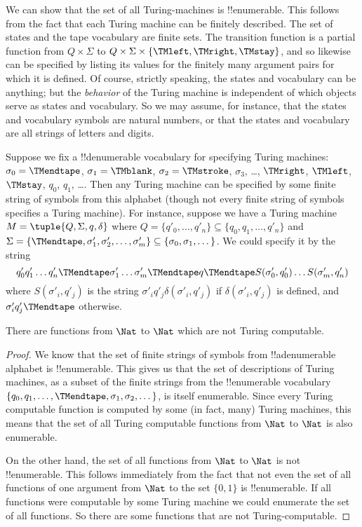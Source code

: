 \documentclass[../../../include/open-logic-section]{subfiles}
\begin{document}

\begin{explain}
We can show that the set of all Turing-machines is
!!{enumerable}. This follows from the fact that each Turing machine
can be finitely described.  The set of states and the tape vocabulary
are finite sets.  The transition function is a partial function from
$Q \times \Sigma$ to $Q \times \Sigma \times \{\TMleft, \TMright,
\TMstay\}$, and so likewise can be specified by listing its values for
the finitely many argument pairs for which it is defined.  Of course,
strictly speaking, the states and vocabulary can be anything; but the
\emph{behavior} of the Turing machine is independent of which objects
serve as states and vocabulary. So we may assume, for instance, that
the states and vocabulary symbols are natural numbers, or that the
states and vocabulary are all strings of letters and digits.

Suppose we fix a !!{denumerable} vocabulary for specifying Turing
machines: $\sigma_0 = \TMendtape$, $\sigma_1 = \TMblank$, $\sigma_2 =
\TMstroke$, $\sigma_3$, \dots, $\TMright$, $\TMleft$, $\TMstay$,
$q_0$, $q_1$, \dots. Then any Turing machine can be specified by some
finite string of symbols from this alphabet (though not every finite
string of symbols specifies a Turing machine). For instance, suppose
we have a Turing machine $M = \tuple{Q, \Sigma, q, \delta}$ where $Q =
\{q'_0, \dots, q'_n\} \subseteq \{q_0, q_1, \dots, q'_n\}$ and $\Sigma
= \{\TMendtape, \sigma'_1, \sigma'_2, \dots, \sigma'_m\}
\subseteq \{\sigma_0, \sigma_1, \dots\}$. We could specify it by
the string
\[
q'_0 q'_1 \dots q'_n \TMendtape \sigma'_1 \dots \sigma'_m \TMendtape q
\TMendtape S(\sigma'_0,q'_0) \dots S(\sigma'_m, q'_n)
\]
where $S(\sigma'_i, q'_j) $ is the string $\sigma'_i q'_j
\delta(\sigma'_i, q'_j)$ if $\delta(\sigma'_i,q'_j)$ is defined, and
$\sigma'_i q'_j \TMendtape$ otherwise.
\end{explain}

\begin{thm}
  There are functions from $\Nat$ to $\Nat$ which are not Turing
  computable.
\end{thm}

\begin{proof}
We know that the set of finite strings of symbols from
!!a{denumerable} alphabet is !!{enumerable}. This gives us that the
set of descriptions of Turing machines, as a subset of the finite
strings from the !!{enumerable} vocabulary $\{q_0, q_1, \dots,
\TMendtape, \sigma_1, \sigma_2, \dots\}$, is itself enumerable.  Since
every Turing computable function is computed by some (in fact, many)
Turing machines, this means that the set of all Turing computable
functions from $\Nat$ to $\Nat$ is also enumerable.

On the other hand, the set of all functions from $\Nat$ to $\Nat$ is
not !!{enumerable}. This follows immediately from the fact that not
even the set of all functions of one argument from $\Nat$
to the set $\{0,1\}$ is !!{enumerable}.  If all functions
were computable by some Turing machine we could enumerate the set of
all functions. So there are some functions that are not
Turing-computable. 
\end{proof}
\end{document}
